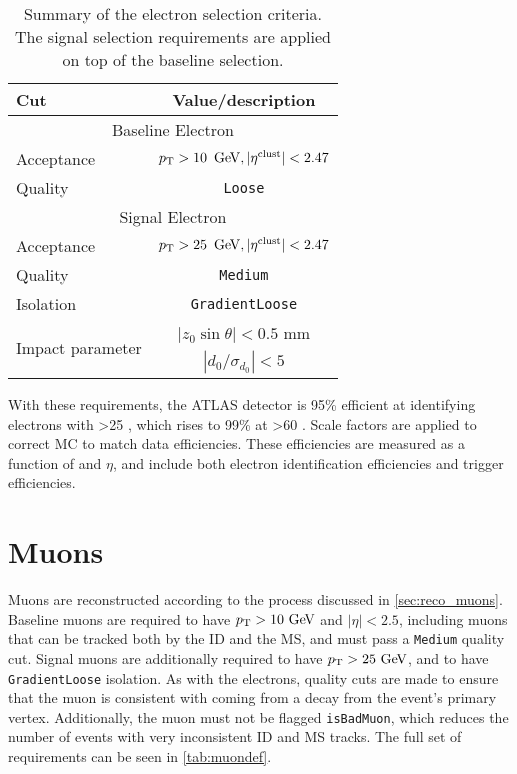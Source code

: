 \begin{table}[ph!]
\begin{center}
    \begin{tabular}{l|c}
      \hline
      Cut            & Value/description \\
      \hline
      \hline
      \multicolumn{2}{c}{Baseline Electron}\\
      \hline
      Acceptance   & $\pt > 10\,\GeV, |\eta^\mathrm{clust}| < 2.47$ \\
      Quality      & \texttt{Loose} \\
      \hline
      \multicolumn{2}{c}{Signal Electron}\\
      \hline
      Acceptance   & $\pt > 25\,\GeV, |\eta^\mathrm{clust}| < 2.47$ \\
      Quality          & \texttt{Medium} \\
      Isolation        & \texttt{GradientLoose} \\
      \multirow{2}{*}{Impact parameter} & $|z_0 \sin\theta|< 0.5$ mm \\
                       & $|d_0/\sigma_{d_0}|< 5$ \\ 
      \hline
      \hline
\end{tabular}
\end{center}
\caption{Summary of the electron selection criteria. The signal selection requirements are applied on top of the baseline selection.
  }              
\label{tab:eledef}
\end{table}

With these requirements, the ATLAS detector is 95\% efficient at identifying electrons with \pt>25 \gev, which rises to 99\% at \pt>60 \gev \cite{ATLAS-CONF-2014-032}. Scale factors are applied to correct \ac{MC} to match data efficiencies. These efficiencies are measured as a function of \pt and $\eta$, and include both electron identification efficiencies and trigger efficiencies. 

\section{Muons}

Muons are reconstructed according to the process discussed in \autoref{sec:reco_muons}. Baseline muons are required to have $\pt>10\gev$ and $|\eta|<2.5$, including muons that can be tracked both by the \ac{ID} and the \ac{MS}, and must pass a \texttt{Medium} quality cut. Signal muons are additionally required to have $\pt>25\gev$, and to have \texttt{GradientLoose} isolation. As with the electrons, quality cuts are made to ensure that the muon is consistent with coming from a decay from the event's primary vertex. Additionally, the muon must not be flagged \texttt{isBadMuon}, which reduces the number of events with very inconsistent \ac{ID} and \ac{MS} tracks. The full set of requirements can be seen in \autoref{tab:muondef}.

